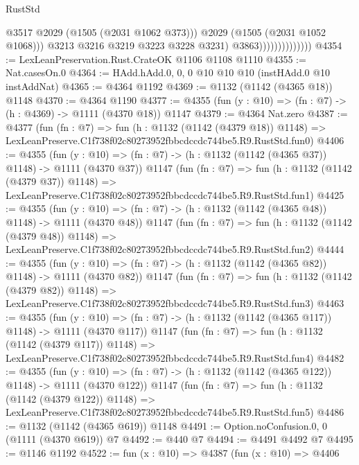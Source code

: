 \begin{lexlean}{RustStd}
\begin{coremodule}
                                      @3517
                                      @2029
                                      (@1505 (@2031 @1062 @373)))
                                    @2029
                                    (@1505 (@2031 @1052 @1068)))
                                  @3213
                                  @3216
                                  @3219
                                  @3223
                                  @3228
                                  @3231)
                                @3863))))))))))))))
@4354 := LexLeanPreservation.Rust.CrateOK @1106 @1108 @1110
@4355 := Nat.casesOn.{0}
@4364 := HAdd.hAdd.{0, 0, 0} @10 @10 @10 (instHAdd.{0} @10 instAddNat)
@4365 := @4364 @1192
@4369 := @1132 (@1142 (@4365 @18)) @1148
@4370 := @4364 @1190
@4377 := @4355 (fun (y : @10) => (fn : @7) -> (h : @4369) -> @1111 (@4370 @18)) @1147
@4379 := @4364 Nat.zero
@4387 := @4377
    (fun (fn : @7) =>
    fun (h : @1132 (@1142 (@4379 @18)) @1148) =>
    LexLeanPreserve.C1f738f02c80273952fbbcdccdc744be5.R9.RustStd.fun0)
@4406 := @4355
    (fun (y : @10) => (fn : @7) -> (h : @1132 (@1142 (@4365 @37)) @1148) -> @1111 (@4370 @37))
    @1147
    (fun (fn : @7) =>
    fun (h : @1132 (@1142 (@4379 @37)) @1148) =>
    LexLeanPreserve.C1f738f02c80273952fbbcdccdc744be5.R9.RustStd.fun1)
@4425 := @4355
    (fun (y : @10) => (fn : @7) -> (h : @1132 (@1142 (@4365 @48)) @1148) -> @1111 (@4370 @48))
    @1147
    (fun (fn : @7) =>
    fun (h : @1132 (@1142 (@4379 @48)) @1148) =>
    LexLeanPreserve.C1f738f02c80273952fbbcdccdc744be5.R9.RustStd.fun2)
@4444 := @4355
    (fun (y : @10) => (fn : @7) -> (h : @1132 (@1142 (@4365 @82)) @1148) -> @1111 (@4370 @82))
    @1147
    (fun (fn : @7) =>
    fun (h : @1132 (@1142 (@4379 @82)) @1148) =>
    LexLeanPreserve.C1f738f02c80273952fbbcdccdc744be5.R9.RustStd.fun3)
@4463 := @4355
    (fun (y : @10) => (fn : @7) -> (h : @1132 (@1142 (@4365 @117)) @1148) -> @1111 (@4370 @117))
    @1147
    (fun (fn : @7) =>
    fun (h : @1132 (@1142 (@4379 @117)) @1148) =>
    LexLeanPreserve.C1f738f02c80273952fbbcdccdc744be5.R9.RustStd.fun4)
@4482 := @4355
    (fun (y : @10) => (fn : @7) -> (h : @1132 (@1142 (@4365 @122)) @1148) -> @1111 (@4370 @122))
    @1147
    (fun (fn : @7) =>
    fun (h : @1132 (@1142 (@4379 @122)) @1148) =>
    LexLeanPreserve.C1f738f02c80273952fbbcdccdc744be5.R9.RustStd.fun5)
@4486 := @1132 (@1142 (@4365 @619)) @1148
@4491 := Option.noConfusion.{0, 0} (@1111 (@4370 @619)) @7
@4492 := @440 @7
@4494 := @4491 @4492 @7
@4495 := @1146 @1192
@4522 := fun (x : @10) =>
  @4387
    (fun (x : @10) =>
    @4406

\end{coremodule}
\end{lexlean}
